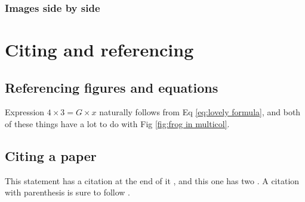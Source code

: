 \documentclass{article}
\begin{document}
\subsubsection{Images side by side}

\section{Citing and referencing}

\subsection{Referencing figures and equations}
 Expression $4\times 3=G\times x$ naturally follows from Eq \ref{eq:lovely formula}, and both of these things have a lot to do with Fig \ref{fig:frog in multicol}.
 
 \subsection{Citing a paper}
This statement has a citation at the end of it \cite{toadetal1958}, and this one has two \cite{toadetal1958, squeaker1982}. A citation with parenthesis is sure to follow \citep{siddiqi2004interspecific}.

 




\end{document}
